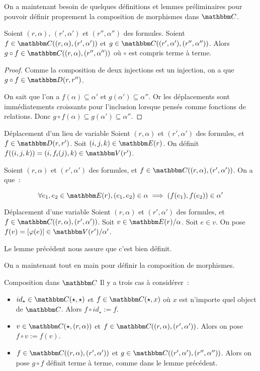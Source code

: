On a maintenant besoin de quelques définitions et lemmes préliminaires pour pouvoir
définir proprement la composition de morphismes dans $\C$.

\begin{lem}
    Soient $(r,\alpha)$, $(r',\alpha')$ et $(r'',\alpha'')$ des formules.
    Soient $f\in\C((r,\alpha),(r',\alpha'))$
        et $g\in\C((r',\alpha'),(r'',\alpha''))$.
    Alors $g\circ f\in\C((r,\alpha),(r'',\alpha''))$ où $\circ$ est compris
    terme à terme.
\end{lem}

\begin{proof}
    Comme la composition de deux injections est un injection, on a que
    $g\circ f\in\D(r,r'')$.

    On sait que l'on a $f(\alpha)\subseteq \alpha'$ et $g(\alpha')\subseteq \alpha''$. Or
    les déplacements sont immédiatements croissants pour l'inclusion lorsque pensés
    comme fonctions de relations.
    Donc $g\circ f(\alpha)\subseteq g(\alpha')\subseteq \alpha''$.
\end{proof}

\begin{defi}{Déplacement d'un lieu de variable}
    Soient $(r,\alpha)$ et $(r',\alpha')$ des formules, et $f\in\D(r,r')$.
    Soit $(i,j,k)\in\E(r)$. On définit $f((i,j,k)) = (i, f_i(j), k)\in\V(r')$.
\end{defi}

\begin{lem}
    Soient $(r,\alpha)$ et $(r',\alpha')$ des formules, et
    $f\in\C((r,\alpha),(r',\alpha'))$.
    On a que~:
    
    \[\forall e_1,e_2\in\E(r), (e_1,e_2)\in\alpha\implies (f(e_1),f(e_2))\in \alpha'\]
\end{lem}

\begin{defi}{Déplacement d'une variable}
    Soient $(r,\alpha)$ et $(r',\alpha')$ des formules, et
    $f\in\C((r,\alpha),(r',\alpha'))$.
    Soit $v\in\E(r)/\alpha$. Soit $e\in v$. On pose $f(v) = [\phi(e)]\in\V(r')/\alpha'$.

    Le lemme précédent nous assure que c'est bien définit.
\end{defi}

On a maintenant tout en main pour définir la composition de morphismes.

\begin{defi}{Composition dans $\C$}
    Il y a trois cas à considérer~:\begin{itemize}
        \item $id_\star\in\C(\star,\star)$ et $f\in\C(\star, x)$ où $x$ est n'importe
            quel object de $\C$. Alors $f\circ id_\star := f$.
        \item $v\in\C(\star, (r,\alpha))$ et $f\in\C((r,\alpha), (r',\alpha'))$. Alors
            on pose $f\circ v := f(v)$.
        \item $f\in\C((r,\alpha),(r',\alpha'))$ et $g\in\C((r',\alpha'),(r'',\alpha''))$.
            Alors on pose $g\circ f$ définit terme à terme, comme dans le lemme
            précédent.
    \end{itemize}
\end{defi}


